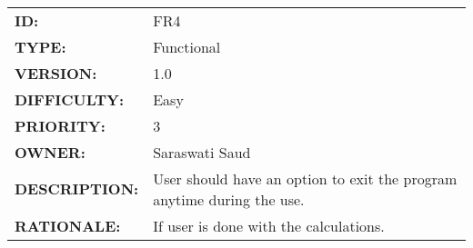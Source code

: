         \\[10pt]
        \begin{tabular}{ |p{4cm} | p{11cm}| }
            \hline
            \textbf{ID:} & FR4\\
            \textbf{TYPE:} & Functional\\
            \textbf{VERSION:} & 1.0\\
            \textbf{DIFFICULTY:} & Easy\\
            \textbf{PRIORITY:} & 3\\
            \textbf{OWNER:} & Saraswati Saud\\
            \textbf{DESCRIPTION:} & User should have an option to exit the program anytime during the use. \\
            \textbf{RATIONALE:} & If user is done with the calculations. \\
            \hline
        \end{tabular}

